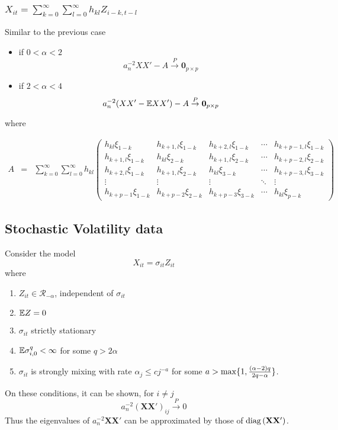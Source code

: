 \documentclass{beamer}
\begin{document}
\begin{frame}
  \frametitle{$X_{it} = \sum_{k=0}^\infty \sum_{l=0}^\infty h_{kl}
    Z_{i-k,t-l}$}
  Similar to the previous case
  \begin{itemize}
  \item if $0 < \alpha < 2$
    \[
    a_n^{-2} XX' - A \overset{P}{\to} \mathbf 0_ {p\times p}
    \]
  \item if $2 < \alpha < 4$
    \[
    a_n^{-2} (XX' - \mathbb{E} XX' )- A \overset{P}{\to} \mathbf 0_ {p\times p}
    \]
  \end{itemize}
  where
  \begin{footnotesize}
    \begin{eqnarray*}
      A &=& \sum_{k=0}^\infty \sum_{l=0}^\infty h_{kl}
      \begin{pmatrix}
        h_{kl} \xi_{1-k} & 
        h_{k+1,l} \xi_{1-k} & 
        h_{k+2,l} \xi_{1-k} & \cdots & h_{k+p-1,l}
        \xi_{1-k}\\
        h_{k+1,l} \xi_{1-k} &
        h_{kl} \xi_{2-k} & 
        h_{k+1,l} \xi_{2-k} & \cdots & h_{k+p-2,l}
        \xi_{2-k}\\
        h_{k+2,l} \xi_{1-k} &
        h_{k+1,l} \xi_{2-k} & 
        h_{kl} \xi_{3-k} & \cdots &
        h_{k+p-3,l} \xi_{3-k}\\
        \vdots & \vdots & \vdots & \ddots & \vdots \\
        h_{k+p-1} \xi_{1-k} & h_{k+p-2} \xi_{2-k} &
        h_{k+p-3} \xi_{3-k} & \cdots & h_{kl} \xi_{p-k}
      \end{pmatrix}
    \end{eqnarray*}
  \end{footnotesize}
\end{frame}

\subsection{Stochastic Volatility data}
Consider the model
\[
X_{it} = \sigma_{it} Z_{it}
\]
where
\begin{enumerate}
\item $Z_{it} \in \mathcal R_{-\alpha}$, independent of $\sigma_{it}$
\item $\mathbb{E} Z = 0$
\item $\sigma_{it}$ strictly stationary
\item $\mathbb{E} \sigma_{i,0}^q < \infty$ for some $q > 2\alpha$
\item $\sigma_{it}$ is strongly mixing with rate $\alpha_j \leq c
  j^{-a}$ for some $a > \max\{1, {(\alpha - 2) q \over 2 q - \alpha}\}$.
\end{enumerate}
On these conditions, it can be shown, for $i \neq j$
\[
a_n^{-2 }(\mathbf{XX'})_{ij} \overset{P}{\to} 0
\]
Thus the eigenvalues of $a_n^{-2 } \mathbf{XX'}$ can be approximated by those
of $\text{diag\,}(\mathbf{XX'})$.
\end{document}
